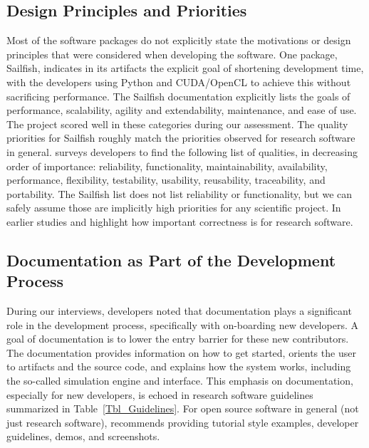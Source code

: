 \documentclass[final, 3p, times, authoryear]{elsarticle}
\begin{document}
\subsection{Design Principles and Priorities} \label{Sec_DesPrincipAndPriorities}

Most of the software packages do not explicitly state the motivations or design
principles that were considered when developing the software. One package,
Sailfish, indicates in its artifacts the explicit goal of shortening development
time, with the developers using Python and CUDA/OpenCL to achieve this without
sacrificing performance. The Sailfish documentation explicitly lists the goals
of performance, scalability, agility and extendability, maintenance, and ease of
use. The project scored well in these categories during our assessment.  The
quality priorities for Sailfish roughly match the priorities observed for
research software in general. \citet{Nguyen-HoanEtAl2010} surveys developers to
find the following list of qualities, in decreasing order of importance:
reliability, functionality, maintainability, availability, performance,
flexibility, testability, usability, reusability, traceability, and portability.
The Sailfish list does not list reliability or functionality, but we can safely
assume those are implicitly high priorities for any scientific project.  In
earlier studies \citet{KellyAndSanders2008} and \citet{CarverEtAl2007} highlight
how important correctness is for research software.

\subsection{Documentation as Part of the Development Process} \label{Sec_DocInDevProc}

During our interviews, developers noted that documentation plays a significant
role in the development process, specifically with on-boarding new developers. A
goal of documentation is to lower the entry barrier for these new contributors.
The documentation provides information on how to get started, orients the user
to artifacts and the source code, and explains how the system works, including
the so-called simulation engine and interface.  This emphasis on documentation,
especially for new developers, is echoed in research software guidelines
summarized in Table~\ref{Tbl_Guidelines}. For open source software in general
(not just research software), \citet{Fogel2005} recommends providing tutorial
style examples, developer guidelines, demos, and screenshots.
\end{document}
